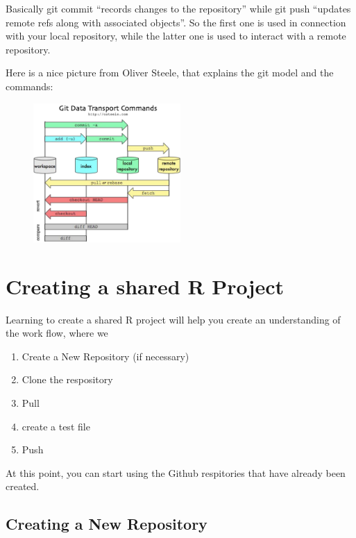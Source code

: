 \documentclass[12pt]{../SOP4_alpha}\usepackage[]{graphicx}\usepackage[]{color}
\begin{document}
\begin{description}
  
Basically git commit ``records changes to the repository'' while git push ``updates remote refs along with associated objects''. So the first one is used in connection with your local repository, while the latter one is used to interact with a remote repository.

Here is a nice picture from Oliver Steele, that explains the git model and the commands:  

\begin{figure}
\centering
\includegraphics[width=0.5\textwidth]{graphics/MgaV9}
\end{figure}
   
\end{description}

\section{Creating a shared R Project}

\NP Learning to create a shared R project will help you create an understanding of the work flow, where we 

\begin{enumerate}
\item Create a New Repository (if necessary)
\item Clone the respository
\item Pull 
\item create a test file
\item Push
\end{enumerate}

\NP At this point, you can start using the Github respitories that have already been created.

\subsection{Creating a New Repository}
\end{document}
